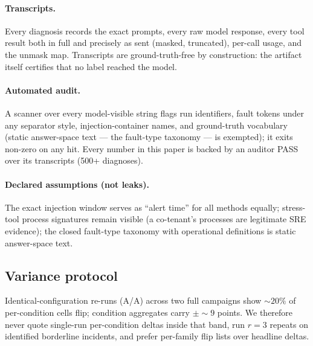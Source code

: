 \paragraph{Transcripts.} Every diagnosis records the exact prompts, every raw model
response, every tool result both in full and precisely as sent (masked, truncated),
per-call usage, and the unmask map. Transcripts are ground-truth-free by construction:
the artifact itself certifies that no label reached the model.

\paragraph{Automated audit.} A scanner over every model-visible string flags run
identifiers, fault tokens under any separator style, injection-container names, and
ground-truth vocabulary (static answer-space text --- the fault-type taxonomy --- is
exempted); it exits non-zero on any hit. Every number in this paper is backed by an
auditor PASS over its transcripts (500+ diagnoses).

\paragraph{Declared assumptions (not leaks).} The exact injection window serves as
``alert time'' for all methods equally; stress-tool process signatures remain visible
(a co-tenant's processes are legitimate SRE evidence); the closed fault-type taxonomy
with operational definitions is static answer-space text.

\subsection{Variance protocol}
\label{sec:variance}
Identical-configuration re-runs (A/A) across two full campaigns show ${\sim}20\%$ of
per-condition cells flip; condition aggregates carry $\pm{\sim}9$ points. We therefore
never quote single-run per-condition deltas inside that band, run $r{=}3$ repeats on
identified borderline incidents, and prefer per-family flip lists over headline deltas.
